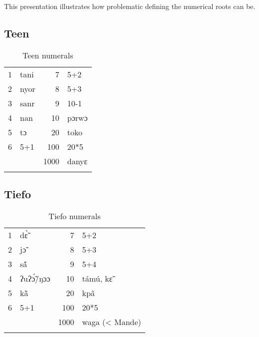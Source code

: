 This presentation illustrates how problematic defining the numerical roots can be.
% 
\clearpage
\subsection{Teen}%
\begin{table}
\caption{\label{tab:3:183}Teen numerals}


\begin{tabularx}{\textwidth}{lQrQ}
\lsptoprule

1 & tani & 7 & 5+2\\
2 & nyor & 8 & 5+3\\
3 & sanr & 9 & 10-1\\
4 & nan & 10 & pɔrwɔ\\
5 & tɔ & 20 & toko\\
6 & 5+1 & 100 & 20*5\\
&  & 1000 & danyɛ\\
\lspbottomrule
\end{tabularx}
\end{table}

 
\subsection{Tiefo}%
\begin{table}
\caption{\label{tab:3:184}Tiefo numerals}


\begin{tabularx}{\textwidth}{lQrQ}
\lsptoprule

1 & d{\`{\~ɛ}} & 7 & 5+2\\
2 & j{\~{ɔ}} & 8 & 5+3\\
3 & s{\'{\~a}} & 9 & 5+4\\
4 & ʔuʔ{\'{\~ɔ}}/ŋɔɔ & 10 & tám{\'{u}}, k{\~{ɛ}}~\\
5 & k{\`{\~a}} & 20 & kp{\~{a}}\\
6 & 5+1 & 100 & 20*5\\
&  & 1000 & waga (< Mande)\\
\lspbottomrule
\end{tabularx}
\end{table}

\clearpage
